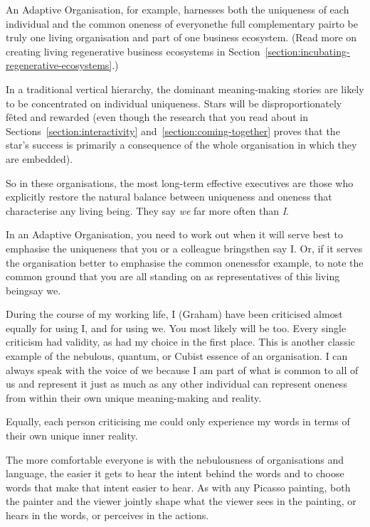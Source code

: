 An Adaptive Organisation, for example, harnesses both the uniqueness of each individual and the common oneness of everyone\textemdash the full complementary pair\textemdash to be truly one living organisation and part of one business ecosystem. (Read more on creating living regenerative business ecosystems  in Section~\ref{section:incubating-regenerative-ecosystems}.)


In a traditional vertical hierarchy, the dominant meaning\hyp{}making stories are likely to be concentrated on individual uniqueness. Stars will be disproportionately fêted and rewarded (even though the research that you read about in Sections~\ref{section:interactivity} and~\ref{section:coming-together} proves that the star’s success is primarily a consequence of the whole organisation in which they are embedded).


So in these organisations, the most long-term effective executives are those who explicitly restore the natural balance between uniqueness and oneness that characterise any living being. They say \emph{we} far more often than \emph{I}. 


In an Adaptive Organisation,  you need to work out when it will serve best to emphasise the uniqueness that you or a colleague brings\textemdash then say I. Or, if it serves the organisation better to emphasise the common oneness\textemdash for example, to note the common ground that you are all standing on as representatives of this living being\textemdash say we. 


During the course of my working life, I (Graham) have been criticised almost equally for using I, and for using we. You most likely will be too. Every single criticism had validity, as had my choice in the first place. This is another classic example of the nebulous, quantum, or Cubist essence of an organisation. I can always speak with the voice of we because I am part of what is common to all of us and represent it just as much as any other individual can represent oneness from within their own unique meaning\hyp{}making and reality. 


Equally, each person criticising me could only experience my words in terms of their own unique inner reality.


The more comfortable everyone is with the nebulousness of organisations and language, the easier it gets to hear the intent behind the words and to choose words that make that intent easier to hear. As with any Picasso painting, both the painter and the viewer jointly shape what the viewer sees in the painting, or hears in the words, or perceives in the actions.


